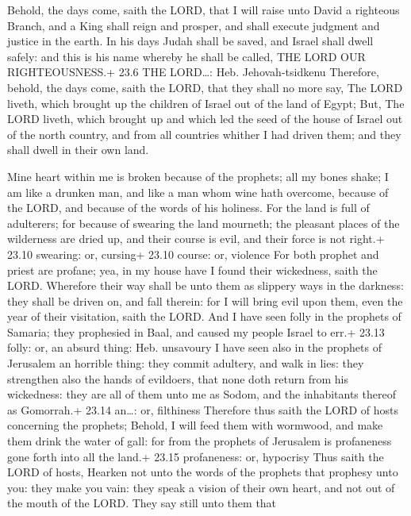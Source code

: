  Behold, the days come, saith the LORD, that I will raise
unto David a righteous Branch, and a King shall reign and prosper, and
shall execute judgment and justice in the earth.  In his
days Judah shall be saved, and Israel shall dwell safely: and this is
his name whereby he shall be called, THE LORD OUR RIGHTEOUSNESS.+ 23.6
THE LORD\ldots: Heb. Jehovah-tsidkenu  Therefore, behold,
the days come, saith the LORD, that they shall no more say, The LORD
liveth, which brought up the children of Israel out of the land of
Egypt;  But, The LORD liveth, which brought up and which led
the seed of the house of Israel out of the north country, and from all
countries whither I had driven them; and they shall dwell in their own
land.

 Mine heart within me is broken because of the prophets;
all my bones shake; I am like a drunken man, and like a man whom wine
hath overcome, because of the LORD, and because of the words of his
holiness.  For the land is full of adulterers; for because
of swearing the land mourneth; the pleasant places of the wilderness are
dried up, and their course is evil, and their force is not right.+ 23.10
swearing: or, cursing+ 23.10 course: or, violence  For both
prophet and priest are profane; yea, in my house have I found their
wickedness, saith the LORD.  Wherefore their way shall be
unto them as slippery ways in the darkness: they shall be driven on, and
fall therein: for I will bring evil upon them, even the year of their
visitation, saith the LORD.  And I have seen folly in the
prophets of Samaria; they prophesied in Baal, and caused my people
Israel to err.+ 23.13 folly: or, an absurd thing: Heb. unsavoury
 I have seen also in the prophets of Jerusalem an horrible
thing: they commit adultery, and walk in lies: they strengthen also the
hands of evildoers, that none doth return from his wickedness: they are
all of them unto me as Sodom, and the inhabitants thereof as Gomorrah.+
23.14 an\ldots: or, filthiness  Therefore thus saith the
LORD of hosts concerning the prophets; Behold, I will feed them with
wormwood, and make them drink the water of gall: for from the prophets
of Jerusalem is profaneness gone forth into all the land.+ 23.15
profaneness: or, hypocrisy  Thus saith the LORD of hosts,
Hearken not unto the words of the prophets that prophesy unto you: they
make you vain: they speak a vision of their own heart, and not out of
the mouth of the LORD.  They say still unto them that
